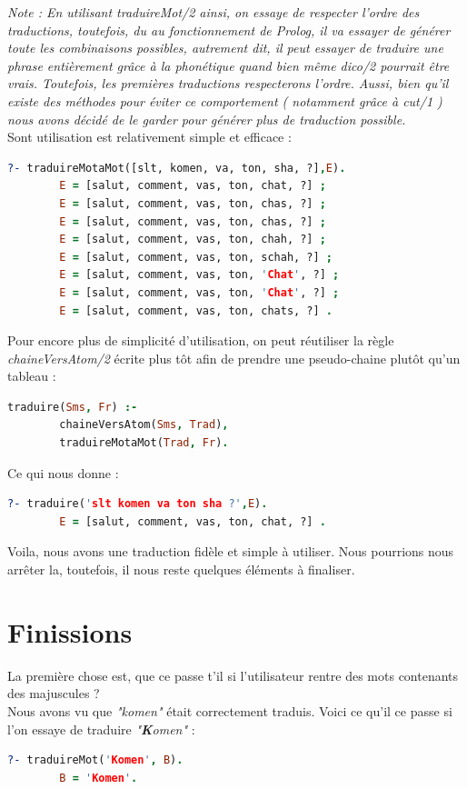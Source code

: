 \documentclass[11pt]{report}
\begin{document}
	{\em Note : En utilisant traduireMot/2 ainsi, on essaye de respecter l'ordre des traductions, toutefois, du au fonctionnement de Prolog, il va essayer de générer toute les combinaisons possibles, autrement dit, il peut essayer de traduire une phrase entièrement grâce à la phonétique quand bien même dico/2 pourrait être vrais. Toutefois, les premières traductions respecterons l'ordre. Aussi, bien qu'il existe des méthodes pour éviter ce comportement ( notamment grâce à cut/1 ) nous avons décidé de le garder pour générer plus de traduction possible.}\\
	
	Sont utilisation est relativement simple et efficace :
	\begin{lstlisting}[language=Prolog]
	?- traduireMotaMot([slt, komen, va, ton, sha, ?],E).
		E = [salut, comment, vas, ton, chat, ?] ;
		E = [salut, comment, vas, ton, chas, ?] ;
		E = [salut, comment, vas, ton, chas, ?] ;
		E = [salut, comment, vas, ton, chah, ?] ;
		E = [salut, comment, vas, ton, schah, ?] ;
		E = [salut, comment, vas, ton, 'Chat', ?] ;
		E = [salut, comment, vas, ton, 'Chat', ?] ;
		E = [salut, comment, vas, ton, chats, ?] .
	\end{lstlisting}
	
	Pour encore plus de simplicité d'utilisation, on peut réutiliser la règle {\em chaineVersAtom/2} écrite plus tôt afin de prendre une pseudo-chaine plutôt qu'un tableau :
	\begin{lstlisting}[language=Prolog]
	traduire(Sms, Fr) :-
		chaineVersAtom(Sms, Trad),
		traduireMotaMot(Trad, Fr).
	\end{lstlisting}
	
	Ce qui nous donne :
	\begin{lstlisting}[language=Prolog]
	?- traduire('slt komen va ton sha ?',E).
		E = [salut, comment, vas, ton, chat, ?] .
	\end{lstlisting}
	
	Voila, nous avons une traduction fidèle et simple à utiliser. Nous pourrions nous arrêter la, toutefois, il nous reste quelques éléments à finaliser. 
	
	\section{Finissions}
	La première chose est, que ce passe t'il si l'utilisateur rentre des mots contenants des majuscules ?\\
	Nous avons vu que {\em "komen"} était correctement traduis. Voici ce qu'il ce passe si l'on essaye de traduire {\em "\textbf{K}omen"} :
	\begin{lstlisting}[language=Prolog]
	?- traduireMot('Komen', B).
		B = 'Komen'.
	\end{lstlisting}
	
\end{document}
